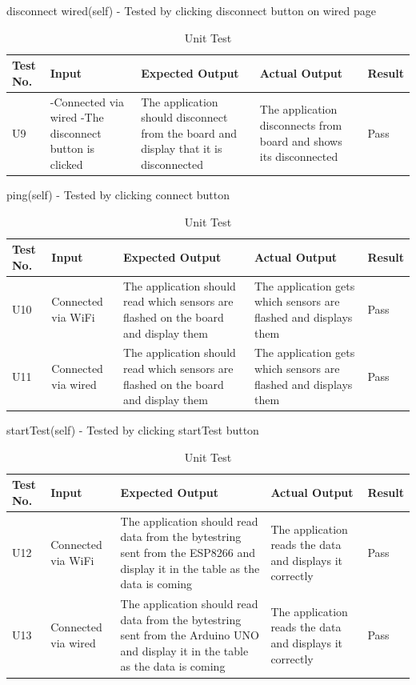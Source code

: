\documentclass[12pt, titlepage]{article}
\begin{document}
  disconnect wired(self) - Tested by clicking disconnect button on wired page
  \begin{table}[H]
    \begin{tabular}{| p{} | p{}| p{}| p{}| p{}|}
      \hline
      \rowcolor[gray]{0.9}
      Test No. & Input & Expected Output & Actual Output & Result\\
      \hline
      U9 & -Connected via wired -The disconnect button is clicked & The application should disconnect from the board and display that it is disconnected & The application disconnects from board and shows its disconnected & Pass \\
      \hline
    \end{tabular}
    \caption{Unit Test}
    \end{table}

  ping(self) - Tested by clicking connect button
  \begin{table}[H]
    \begin{tabular}{| p{} | p{}| p{}| p{}| p{}|}
      \hline
      \rowcolor[gray]{0.9}
      Test No. & Input & Expected Output & Actual Output & Result\\
      \hline
      U10 & Connected via WiFi & The application should read which sensors are flashed on the board and display them & The application gets which sensors are flashed and displays them & Pass \\
      \hline
      U11 & Connected via wired & The application should read which sensors are flashed on the board and display them & The application gets which sensors are flashed and displays them & Pass \\
      \hline
    \end{tabular}
    \caption{Unit Test}
    \end{table}

  startTest(self) - Tested by clicking startTest button
  \begin{table}[H]
    \begin{tabular}{| p{} | p{}| p{}| p{}| p{}|}
      \hline
      \rowcolor[gray]{0.9}
      Test No. & Input & Expected Output & Actual Output & Result\\
      \hline
      U12 & Connected via WiFi & The application should read data from the bytestring sent from the ESP8266 and display it in the table as the data is coming & The application reads the data and displays it correctly & Pass \\
      \hline
      U13 & Connected via wired & The application should read data from the bytestring sent from the Arduino UNO and display it in the table as the data is coming & The application reads the data and displays it correctly & Pass \\
      \hline
    \end{tabular}
    \caption{Unit Test}
    \end{table}
\end{document}
